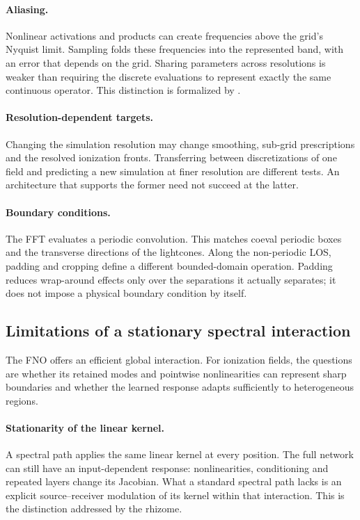 \paragraph{Aliasing.} Nonlinear activations and products can create frequencies above the grid's Nyquist limit. Sampling folds these frequencies into the represented band, with an error that depends on the grid. Sharing parameters across resolutions is weaker than requiring the discrete evaluations to represent exactly the same continuous operator. This distinction is formalized by \citet{bartolucci2023representation}.

\paragraph{Resolution-dependent targets.} Changing the simulation resolution may change smoothing, sub-grid prescriptions and the resolved ionization fronts. Transferring between discretizations of one field and predicting a new simulation at finer resolution are different tests. An architecture that supports the former need not succeed at the latter.

\paragraph{Boundary conditions.} The FFT evaluates a periodic convolution. This matches coeval periodic boxes and the transverse directions of the lightcones. Along the non-periodic LOS, padding and cropping define a different bounded-domain operation. Padding reduces wrap-around effects only over the separations it actually separates; it does not impose a physical boundary condition by itself.

\subsection{Limitations of a stationary spectral interaction}
\label{sec:fno-limitations}

The FNO offers an efficient global interaction. For ionization fields, the questions are whether its retained modes and pointwise nonlinearities can represent sharp boundaries and whether the learned response adapts sufficiently to heterogeneous regions.

\paragraph{Stationarity of the linear kernel.} A spectral path applies the same linear kernel at every position. The full network can still have an input-dependent response: nonlinearities, conditioning and repeated layers change its Jacobian. What a standard spectral path lacks is an explicit source--receiver modulation of its kernel within that interaction. This is the distinction addressed by the rhizome.

